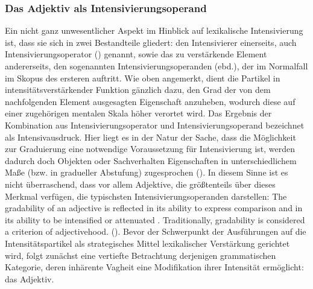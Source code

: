 \subsubsection{Das Adjektiv als Intensivierungsoperand} \label{Adjektiv}
Ein nicht ganz unwesentlicher Aspekt im Hinblick auf lexikalische Intensivierung ist, dass sie sich in zwei Bestandteile gliedert: den Intensivierer einerseits, auch \glqq{}Intensivierungsoperator\grqq{} (\citealt[2]{Os.1989}) genannt, sowie das zu verstärkende Element andererseits, den sogenannten \glqq{}Intensivierungsoperanden\grqq{} (ebd.), der im Normalfall im Skopus des ersteren auftritt. Wie oben angemerkt, dient die Partikel in intensitätsverstärkender Funktion gänzlich dazu, den Grad der von dem nachfolgenden Element ausgesagten Eigenschaft anzuheben, wodurch diese auf einer zugehörigen mentalen Skala höher verortet wird. Das Ergebnis der Kombination aus Intensivierungsoperator und Intensivierungsoperand bezeichnet {\citet[2]{Os.1989}} als \glqq{}Intensivausdruck\grqq{}. Hier liegt es in der Natur der Sache, dass die Möglichkeit zur Graduierung eine notwendige Voraussetzung für Intensivierung ist, werden dadurch doch \glqq{}Objekten oder Sachverhalten Eigenschaften in unterschiedlichem Maße (bzw. in gradueller Abstufung) zugesprochen\grqq{} (\citealt[259]{Bussmann.2002}). In diesem Sinne ist es nicht überraschend, dass vor allem Adjektive, die größtenteils über dieses Merkmal verfügen, die typischsten Intensivierungsoperanden darstellen: \glqq{}The gradability of an adjective is reflected in its ability to express comparison \textelp{} and in its ability to be intensified \textelp{} or attenuated \textelp{}. Traditionally, gradability is considered a criterion of adjectivehood.\grqq{} (\citealt[93]{Warren.1984}). Bevor der Schwerpunkt der Ausführungen auf die Intensitätspartikel als strategisches Mittel lexikalischer Verstärkung gerichtet wird, folgt zunächst eine vertiefte Betrachtung derjenigen grammatischen Kategorie, deren inhärente Vagheit eine Modifikation ihrer Intensität ermöglicht: das Adjektiv.

